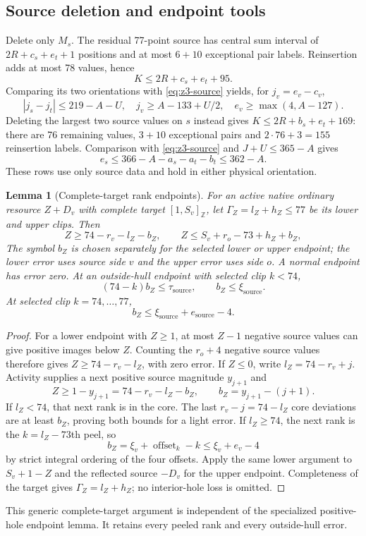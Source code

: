 \documentclass[11pt,letterpaper]{article}
\newcommand{\Z}{\mathbb Z}\newcommand{\R}{\mathbb R}
\newtheorem{lemma}[theorem]{Lemma}
\theoremstyle{definition}\newtheorem{definition}[theorem]{Definition}
\begin{document}
\subsection{Source deletion and endpoint tools}
Delete only $M_s$. The residual 77-point source has central sum interval of $2R+c_s+e_t+1$ positions and at most $6+10$ exceptional pair labels. Reinsertion adds at most 78 values, hence
\[
 K\le2R+c_s+e_t+95.
\]
Comparing its two orientations with \eqref{eq:z3-source} yields, for $j_v=e_v-c_v$,
\[
 |j_s-j_t|\le219-A-U,\quad j_v\ge A-133+U/2,\quad
 e_v\ge\max(4,A-127).
\]
Deleting the largest two source values on $s$ instead gives
$K\le2R+b_s+e_t+169$: there are 76 remaining values, $3+10$ exceptional pairs and $2\cdot76+3=155$ reinsertion labels. Comparison with \eqref{eq:z3-source} and $J+U\le365-A$ gives
\begin{equation}\label{eq:z3-side}e_s\le366-A-a_s-a_t-b_t\le362-A.\end{equation}
These rows use only source data and hold in either physical orientation.

\begin{lemma}[Complete-target rank endpoints]\label{lem:z-rank-endpoint}
For an active native ordinary resource $Z+D_v$ with complete target $[1,S_v]_{\Z}$, let $\Gamma_Z=l_Z+h_Z\le77$ be its lower and upper clips. Then
\[
 Z\ge74-r_v-l_Z-b_Z,\qquad
 Z\le S_v+r_o-73+h_Z+b_Z,
\]
The symbol $b_Z$ is chosen separately for the selected lower or upper endpoint; the lower error uses source side $v$ and the upper error uses side $o$.
A normal endpoint has error zero. At an outside-hull endpoint with selected clip $k<74$,
\[
 (74-k)b_Z\le\tau_{\mathrm{source}},\qquad b_Z\le\xi_{\mathrm{source}}.
\]
At selected clip $k=74,\ldots,77$,
\begin{equation}\label{eq:z3-tail-error}
 b_Z\le\xi_{\mathrm{source}}+e_{\mathrm{source}}-4.
\end{equation}
\end{lemma}
\begin{proof}
For a lower endpoint with $Z\ge1$, at most $Z-1$ negative source values can give positive images below $Z$. Counting the $r_o+4$ negative source values therefore gives $Z\ge74-r_v-l_Z$, with zero error. If $Z\le0$, write $l_Z=74-r_v+j$. Activity supplies a next positive source magnitude $y_{j+1}$ and
\[
Z\ge1-y_{j+1}=74-r_v-l_Z-b_Z,\qquad b_Z=y_{j+1}-(j+1).
\]
If $l_Z<74$, that next rank is in the core. The last $r_v-j=74-l_Z$ core deviations are at least $b_Z$, proving both bounds for a light error. If $l_Z\ge74$, the next rank is the $k=l_Z-73$th peel, so
\[
b_Z=\xi_v+\operatorname{offset}_k-k\le\xi_v+e_v-4
\]
by strict integral ordering of the four offsets. Apply the same lower argument to $S_v+1-Z$ and the reflected source $-D_v$ for the upper endpoint. Completeness of the target gives $\Gamma_Z=l_Z+h_Z$; no interior-hole loss is omitted.
\end{proof}
This generic complete-target argument is independent of the specialized positive-hole endpoint lemma. It retains every peeled rank and every outside-hull error.
\end{document}
